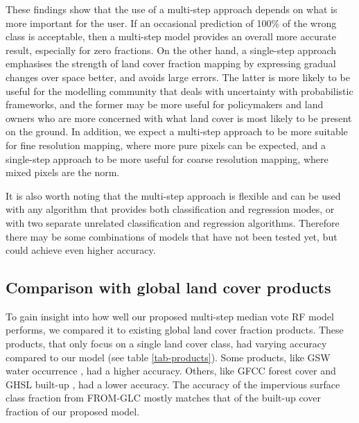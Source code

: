 \documentclass[review,authoryear,3p]{elsarticle}
\begin{document}
These findings show that the use of a multi-step approach depends on what is more important for the user.
If an occasional prediction of 100\% of the wrong class is acceptable, then a multi-step model provides an overall more accurate result, especially for zero fractions.
On the other hand, a single-step approach emphasises the strength of land cover fraction mapping by expressing gradual changes over space better, and avoids large errors.
The latter is more likely to be useful for the modelling community that deals with uncertainty with probabilistic frameworks, and the former may be more useful for policymakers and land owners who are more concerned with what land cover is most likely to be present on the ground.
In addition, we expect a multi-step approach to be more suitable for fine resolution mapping, where more pure pixels can be expected, and a single-step approach to be more useful for coarse resolution mapping, where mixed pixels are the norm.

It is also worth noting that the multi-step approach is flexible and can be used with any algorithm that provides both classification and regression modes, or with two separate unrelated classification and regression algorithms.
Therefore there may be some combinations of models that have not been tested yet, but could achieve even higher accuracy.

\subsection{Comparison with global land cover products}

To gain insight into how well our proposed multi-step median vote \gls{RF} model performs, we compared it to existing global land cover fraction products.
These products, that only focus on a single land cover class, had varying accuracy compared to our model (see table \ref{tab-products}).
Some products, like \gls{GSW} water occurrence \citep{pekel_high-resolution_2016}, had a higher accuracy.
Others, like \gls{GFCC} forest cover \citep{townshend_global_2017} and \gls{GHSL} built-up \citep{corbane_automated_2019}, had a lower accuracy.
The accuracy of the impervious surface class fraction from \gls{FROM-GLC} mostly matches that of the built-up cover fraction of our proposed model.
\end{document}
